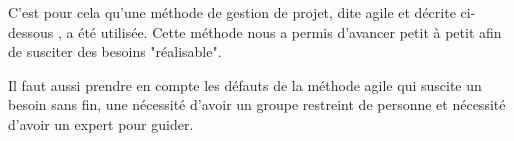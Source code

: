 C'est pour cela qu'une méthode de gestion de projet, dite agile et décrite ci-dessous , a été utilisée. Cette méthode nous a permis d'avancer petit à petit afin de susciter des besoins "réalisable". 

Il faut aussi prendre en compte les défauts de la méthode agile qui suscite un besoin sans fin, une nécessité d'avoir un groupe restreint de personne et nécessité d’avoir un expert pour guider.










